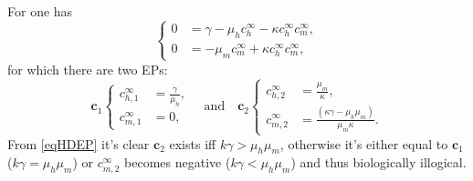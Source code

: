 \documentclass{article}
\begin{document}
                For \HDcontinuous{} one has
                \begin{equation}
                    \left\{
                    \begin{aligned}
                        0&=\gamma-\mu_hc^\infty_h-\kappa c^\infty_hc^\infty_m,\\[5pt]
                        0&=-\mu_mc^\infty_m+\kappa c^\infty_hc^\infty_m,
                    \end{aligned}
                    \right.
                    \label{eqHDContinuousAsymptoticSystem}
                \end{equation}
                for which there are two EPs:
                \begin{equation}
                    \newcommand\vspcR{2pt}
                    \mathbf c_1\left\{
                    \begin{aligned}
                        c_{h,1}^\infty&=\frac\gamma{\mu_h},\\[\vspcR]
                        c_{m,1}^\infty&=0,
                    \end{aligned}
                    \right.
                    \quad\text{and}\quad
                    \mathbf c_2\left\{
                    \begin{aligned}
                        c_{h,2}^\infty&=\frac{\mu_m}\kappa,\\[\vspcR]
                        c_{m,2}^\infty&=\frac{\left(\kappa\gamma-\mu_h\mu_m\right)}{\mu_m\kappa}.
                    \end{aligned}
                    \right.
                    \label{eqHDEP}
                \end{equation}
                From \eqref{eqHDEP} it's clear $\mathbf c_2$ exists iff $k\gamma>\mu_h\mu_m$, otherwise it's either equal to $\mathbf c_1$ ($k\gamma=\mu_h\mu_m$) or $c_{m,2}^\infty$ becomes negative ($k\gamma<\mu_h\mu_m$) and thus biologically illogical.
\end{document}
